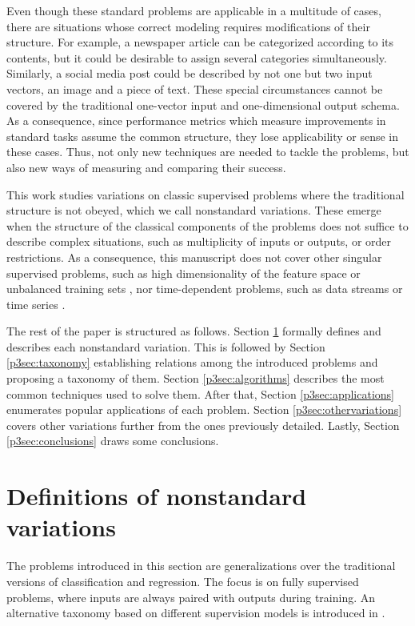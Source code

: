 Even though these standard problems are applicable in a multitude of cases, there are situations whose correct modeling requires modifications of their structure. For example, a newspaper article can be categorized according to its contents, but it could be desirable to assign several categories simultaneously. Similarly, a social media post could be described by not one but two input vectors, an image and a piece of text. These special circumstances cannot be covered by the traditional one-vector input and one-dimensional output schema. As a consequence, since performance metrics which measure improvements in standard tasks assume the common structure, they lose applicability or sense in these cases. Thus, not only new techniques are needed to tackle the problems, but also new ways of measuring and comparing their success.

This work studies variations on classic supervised problems where the traditional structure is not obeyed, which we call nonstandard variations. These emerge when the structure of the classical components of the problems does not suffice to describe complex situations, such as multiplicity of inputs or outputs, or order restrictions. As a consequence, this manuscript does not cover other singular supervised problems, such as high dimensionality of the feature space  or unbalanced training sets , nor time-dependent problems, such as data streams  or time series .

The rest of the paper is structured as follows. Section \ref{p3sec:definitions} formally defines and describes each nonstandard variation. This is followed by Section \ref{p3sec:taxonomy} establishing relations among the introduced problems and proposing a taxonomy of them. Section \ref{p3sec:algorithms} describes the most common techniques used to solve them. After that, Section \ref{p3sec:applications} enumerates popular applications of each problem. {Section \ref{p3sec:othervariations} covers other variations further from the ones previously detailed.} Lastly, Section \ref{p3sec:conclusions} draws some conclusions.

\section{Definitions of nonstandard variations}
\label{p3sec:definitions}

The problems introduced in this section are generalizations over the traditional versions of classification and regression. The focus is on fully supervised problems, where inputs are always paired with outputs during training. An alternative taxonomy based on different supervision models is introduced in .


